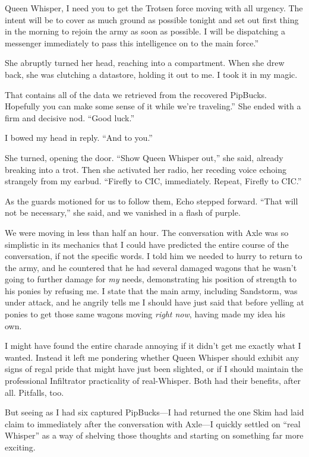 \leavevmode{}Queen Whisper, I need you to get the Trotsen force moving with all urgency. The intent will be to cover as much ground as possible tonight and set out first thing in the morning to rejoin the army as soon as possible. I will be dispatching a messenger immediately to pass this intelligence on to the main force.”

She abruptly turned her head, reaching into a compartment. When she drew back, she was clutching a datastore, holding it out to me. I took it in my magic.

\leavevmode{}That contains all of the data we retrieved from the recovered PipBucks. Hopefully you can make some sense of it while we’re traveling.” She ended with a firm and decisive nod. “Good luck.”

I bowed my head in reply. “And to you.”

She turned, opening the door. “Show Queen Whisper out,” she said, already breaking into a trot. Then she activated her radio, her receding voice echoing strangely from my earbud. “Firefly to CIC, immediately. Repeat, Firefly to CIC.”

As the guards motioned for us to follow them, Echo stepped forward. “That will not be necessary,” she said, and we vanished in a flash of purple.

{\br}%
We were moving in less than half an hour. The conversation with Axle was so simplistic in its mechanics that I could have predicted the entire course of the conversation, if not the specific words. I told him we needed to hurry to return to the army, and he countered that he had several damaged wagons that he wasn’t going to further damage for \textit{my} needs, demonstrating his position of strength to his ponies by refusing me. I state that the main army, including Sandstorm, was under attack, and he angrily tells me I should have just said that before yelling at ponies to get those same wagons moving \textit{right now}, having made my idea his own.

I might have found the entire charade annoying if it didn’t get me exactly what I wanted. Instead it left me pondering whether Queen Whisper should exhibit any signs of regal pride that might have just been slighted, or if I should maintain the professional Infiltrator practicality of real-Whisper. Both had their benefits, after all. Pitfalls, too.

But seeing as I had six captured PipBucks—I had returned the one Skim had laid claim to immediately after the conversation with Axle—I quickly settled on “real Whisper” as a way of shelving those thoughts and starting on something far more exciting.


